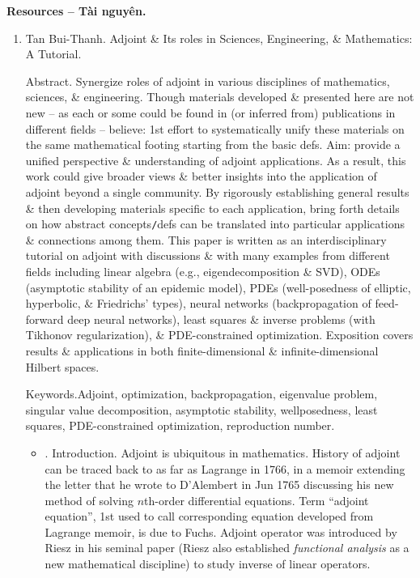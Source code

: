 \documentclass{article}
\begin{document}
\noindent\textbf{\textsf{Resources -- Tài nguyên.}}
\begin{enumerate}
	\item {\sc Tan Bui-Thanh}. {\sc Adjoint \& Its roles in Sciences, Engineering, \& Mathematics: A Tutorial}.

	{\sf Abstract.} Synergize roles of adjoint in various disciplines of mathematics, sciences, \& engineering. Though materials developed \& presented here are not new -- as each or some could be found in (or inferred from) publications in different fields -- believe: 1st effort to systematically unify these materials on the same mathematical footing starting from the basic defs. Aim: provide a unified perspective \& understanding of adjoint applications. As a result, this work could give broader views \& better insights into the application of adjoint beyond a single community. By rigorously establishing general results \& then developing materials specific to each application, bring forth details on how abstract concepts{\tt/}defs can be translated into particular applications \& connections among them. This paper is written as an interdisciplinary tutorial on adjoint with discussions \& with many examples from different fields including linear algebra (e.g., eigendecomposition \& SVD), ODEs (asymptotic stability of an epidemic model), PDEs (well-posedness of elliptic, hyperbolic, \& Friedrichs' types), neural networks (backpropagation of feed-forward deep neural networks), least squares \& inverse problems (with Tikhonov regularization), \& PDE-constrained optimization. Exposition covers results \& applications in both finite-dimensional \& infinite-dimensional Hilbert spaces.

	{\sf Keywords.}Adjoint, optimization, backpropagation, eigenvalue problem, singular value decomposition, asymptotic stability, wellposedness, least squares, PDE-constrained optimization, reproduction number.
	\begin{itemize}
		\item {. Introduction.} Adjoint is ubiquitous in mathematics. History of adjoint can be traced back to as far as {\sc Lagrange} in 1766, in a memoir extending the letter that he wrote to {\sc D'Alembert} in Jun 1765 discussing his new method of solving $n$th-order differential equations. Term ``adjoint equation'', 1st used to call corresponding equation developed from Lagrange memoir, is due to {\sc Fuchs}. Adjoint operator was introduced by {\sc Riesz} in his seminal paper ({\sc Riesz} also established {\it functional analysis} as a new mathematical discipline) to study inverse of linear operators.


\end{itemize}
\end{enumerate}
\end{document}
